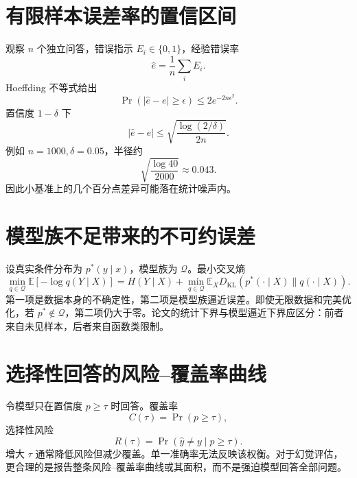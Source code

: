 \documentclass[UTF8,12pt,a4paper,fontset=none]{ctexart}
\numberwithin{equation}{section}
\newcommand{\E}{\mathbb{E}}
\newcommand{\KL}{D_{\mathrm{KL}}}
\begin{document}
\section{有限样本误差率的置信区间}
观察 $n$ 个独立问答，错误指示 $E_i\in\{0,1\}$，经验错误率
\begin{equation}
 \hat e=\frac1n\sum_iE_i.
\end{equation}
Hoeffding 不等式给出
\begin{equation}
 \Pr(|\hat e-e|\ge\epsilon)
 \le2e^{-2n\epsilon^2}.
\end{equation}
置信度 $1-\delta$ 下
\begin{equation}
 |\hat e-e|\le
 \sqrt{\frac{\log(2/\delta)}{2n}}.
\end{equation}
例如 $n=1000,\delta=0.05$，半径约
\begin{equation}
 \sqrt{\frac{\log40}{2000}}\approx0.043.
\end{equation}
因此小基准上的几个百分点差异可能落在统计噪声内。

\section{模型族不足带来的不可约误差}
设真实条件分布为 $p^*(y\mid x)$，模型族为 $\mathcal Q$。最小交叉熵
\begin{equation}
 \min_{q\in\mathcal Q}\E[-\log q(Y\mid X)]
 =H(Y\mid X)+
 \min_{q\in\mathcal Q}\E_X\KL(p^*(\cdot\mid X)\|q(\cdot\mid X)).
\end{equation}
第一项是数据本身的不确定性，第二项是模型族逼近误差。即使无限数据和完美优化，若 $p^*\notin\mathcal Q$，第二项仍大于零。论文的统计下界与模型逼近下界应区分：前者来自未见样本，后者来自函数类限制。

\section{选择性回答的风险--覆盖率曲线}
令模型只在置信度 $p\ge\tau$ 时回答。覆盖率
\begin{equation}
 C(\tau)=\Pr(p\ge\tau),
\end{equation}
选择性风险
\begin{equation}
 R(\tau)=\Pr(\hat y\ne y\mid p\ge\tau).
\end{equation}
增大 $\tau$ 通常降低风险但减少覆盖。单一准确率无法反映该权衡。对于幻觉评估，更合理的是报告整条风险--覆盖率曲线或其面积，而不是强迫模型回答全部问题。
\end{document}
